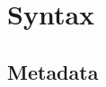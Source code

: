 
\def\mytitle{MultiMarkdown Syntax}
\def\myauthor{Fletcher T. Penney}
\def\version{6.0a}
\def\revised{2017-06-07}


\chapter{Syntax }
\label{syntax}

\section{Metadata }
\label{metadata}



